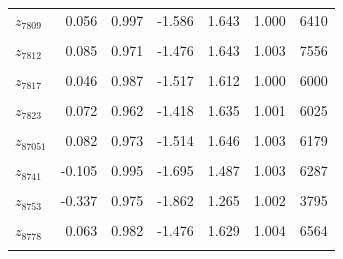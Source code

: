 \begin{longtable}{lrrrrrr}
$z_{7809}$ & 0.056 & 0.997 & -1.586 & 1.643 & 1.000 & 6410\\
\cellcolor{gray!10}{$z_{7811}$} & \cellcolor{gray!10}{0.127} & \cellcolor{gray!10}{0.986} & \cellcolor{gray!10}{-1.469} & \cellcolor{gray!10}{1.686} & \cellcolor{gray!10}{1.000} & \cellcolor{gray!10}{6233}\\
$z_{7812}$ & 0.085 & 0.971 & -1.476 & 1.643 & 1.003 & 7556\\
\cellcolor{gray!10}{$z_{7814}$} & \cellcolor{gray!10}{0.063} & \cellcolor{gray!10}{0.987} & \cellcolor{gray!10}{-1.481} & \cellcolor{gray!10}{1.636} & \cellcolor{gray!10}{1.001} & \cellcolor{gray!10}{6851}\\
$z_{7817}$ & 0.046 & 0.987 & -1.517 & 1.612 & 1.000 & 6000\\
\cellcolor{gray!10}{$z_{7819}$} & \cellcolor{gray!10}{0.230} & \cellcolor{gray!10}{0.964} & \cellcolor{gray!10}{-1.318} & \cellcolor{gray!10}{1.772} & \cellcolor{gray!10}{1.002} & \cellcolor{gray!10}{4981}\\
$z_{7823}$ & 0.072 & 0.962 & -1.418 & 1.635 & 1.001 & 6025\\
\cellcolor{gray!10}{$z_{8693}$} & \cellcolor{gray!10}{0.013} & \cellcolor{gray!10}{1.013} & \cellcolor{gray!10}{-1.622} & \cellcolor{gray!10}{1.628} & \cellcolor{gray!10}{1.003} & \cellcolor{gray!10}{6341}\\
$z_{87051}$ & 0.082 & 0.973 & -1.514 & 1.646 & 1.003 & 6179\\
\cellcolor{gray!10}{$z_{8705}$} & \cellcolor{gray!10}{0.192} & \cellcolor{gray!10}{0.990} & \cellcolor{gray!10}{-1.408} & \cellcolor{gray!10}{1.734} & \cellcolor{gray!10}{1.001} & \cellcolor{gray!10}{5143}\\
$z_{8741}$ & -0.105 & 0.995 & -1.695 & 1.487 & 1.003 & 6287\\
\cellcolor{gray!10}{$z_{8747}$} & \cellcolor{gray!10}{0.207} & \cellcolor{gray!10}{0.948} & \cellcolor{gray!10}{-1.314} & \cellcolor{gray!10}{1.719} & \cellcolor{gray!10}{1.004} & \cellcolor{gray!10}{4414}\\
$z_{8753}$ & -0.337 & 0.975 & -1.862 & 1.265 & 1.002 & 3795\\
\cellcolor{gray!10}{$z_{8764}$} & \cellcolor{gray!10}{0.185} & \cellcolor{gray!10}{0.976} & \cellcolor{gray!10}{-1.377} & \cellcolor{gray!10}{1.697} & \cellcolor{gray!10}{1.003} & \cellcolor{gray!10}{6235}\\
$z_{8778}$ & 0.063 & 0.982 & -1.476 & 1.629 & 1.004 & 6564\\
\cellcolor{gray!10}{$z_{8913}$} & \cellcolor{gray!10}{-0.061} & \cellcolor{gray!10}{0.962} & \cellcolor{gray!10}{-1.616} & \cellcolor{gray!10}{1.455} & \cellcolor{gray!10}{1.004} & \cellcolor{gray!10}{6988}\\

\end{longtable}
